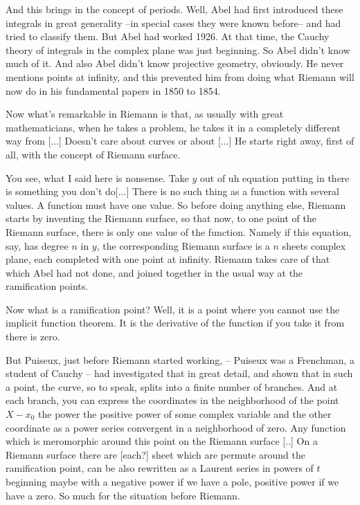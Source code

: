 \documentclass{article}
\begin{document}
And this brings in the concept of periods.
Well, Abel had first introduced these integrals 
in great generality 
--in special cases they were known before-- 
and had tried to classify them.
But Abel had worked 1926.
At that time, the Cauchy theory of integrals 
in the complex plane was just beginning.
So Abel didn't know much of it.
And also Abel didn't know projective geometry, obviously.
He never mentions points at infinity,
and this prevented him from doing 
what Riemann will now do 
in his fundamental papers in 1850 to 1854.

Now what's remarkable in Riemann is that, 
as usually with great mathematicians,
when he takes a problem, 
he takes it in a completely different way from [...]
Doesn't care about curves or about [...]
He starts right away, first of all, 
with the concept of Riemann surface.

You see, what I said here is nonsense.
Take $y$ out of uh equation 
putting in there is something you don't do[...]
There is no such thing as a function with several values.
A function must have one value.
So before doing anything else, 
Riemann starts by inventing the Riemann surface,
so that now, to one point of the Riemann surface, 
there is only one value of the function.
Namely if this equation, say, has degree $n$ in $y$, 
the corresponding Riemann surface is a $n$ sheets complex plane,
each completed with one point at infinity. 
Riemann takes care of that which Abel had not done,
and joined together in the usual way at the ramification points.

Now what is a ramification point?
Well, it is a point 
where you cannot use the implicit function theorem.
It is the derivative of the function if you take it from there is zero.

But Puiseux, just before Riemann started working,
-- Puiseux was a Frenchman, a student of Cauchy -- 
had investigated that in great detail,
and shown that in such a point,
the curve, so to speak, splits 
into a finite number of branches.
And at each branch, you can express the coordinates 
in the neighborhood of the point $X-x_0$ 
the power the positive power 
of some complex variable 
and the other coordinate 
as a power series convergent 
in a neighborhood of zero.
Any function which is meromorphic 
around this point on the Riemann surface [..] 
On a Riemann surface there are
[each?] sheet which are permute 
around the ramification point, 
can be also rewritten as a Laurent series
in powers of $t$ beginning maybe 
with a negative power if we have a pole,
positive power if we have a zero.
So much for the situation before Riemann.
\end{document}
